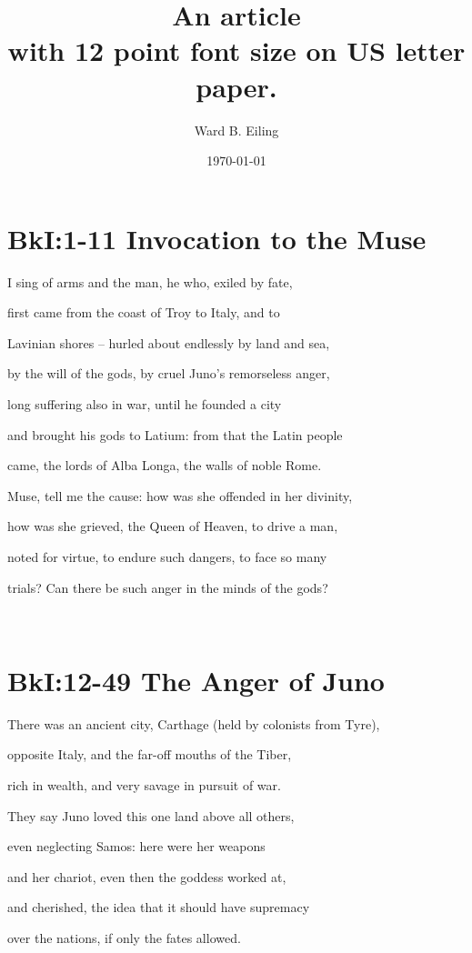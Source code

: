 \documentclass[12pt, letterpaper, titlepage]{article}
\title{An article \\ \small with 12 point font size on US letter paper.}
\author{Ward B. Eiling}
\date{\today}
\begin{document}
\maketitle
\newpage

\section*{BkI:1-11 Invocation to the Muse}

I sing of arms and the man, he who, exiled by fate,

first came from the coast of Troy to Italy, and to

Lavinian shores – hurled about endlessly by land and sea,

by the will of the gods, by cruel Juno’s remorseless anger,

long suffering also in war, until he founded a city

and brought his gods to Latium: from that the Latin people

came, the lords of Alba Longa, the walls of noble Rome.

Muse, tell me the cause: how was she offended in her divinity,

how was she grieved, the Queen of Heaven, to drive a man,

noted for virtue, to endure such dangers, to face so many

trials? Can there be such anger in the minds of the gods?


\\


\section*{BkI:12-49 The Anger of Juno}

There was an ancient city, Carthage (held by colonists from Tyre),

opposite Italy, and the far-off mouths of the Tiber,

rich in wealth, and very savage in pursuit of war.

They say Juno loved this one land above all others,

even neglecting Samos: here were her weapons

and her chariot, even then the goddess worked at,

and cherished, the idea that it should have supremacy

over the nations, if only the fates allowed.
\end{document}
